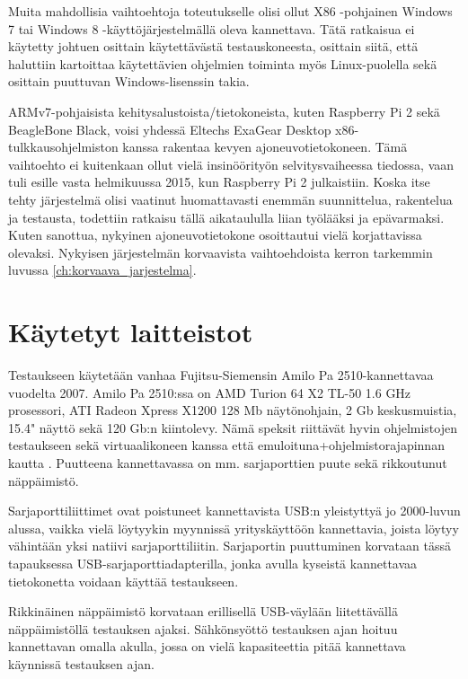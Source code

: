 Muita mahdollisia vaihtoehtoja toteutukselle olisi ollut X86 -pohjainen Windows 7 tai Windows 8 -käyttöjärjestelmällä oleva kannettava. Tätä ratkaisua ei käytetty johtuen osittain käytettävästä testauskoneesta, osittain siitä, että haluttiin kartoittaa käytettävien ohjelmien toiminta myös Linux-puolella sekä osittain puuttuvan Windows-lisenssin takia.

ARMv7-pohjaisista kehitysalustoista/tietokoneista, kuten Raspberry Pi 2 sekä BeagleBone Black, voisi yhdessä Eltechs ExaGear Desktop x86-tulkkausohjelmiston kanssa rakentaa kevyen ajoneuvotietokoneen. Tämä vaihtoehto ei kuitenkaan ollut vielä insinöörityön selvitysvaiheessa tiedossa, vaan tuli esille vasta helmikuussa 2015, kun Raspberry Pi 2 julkaistiin. Koska itse tehty järjestelmä olisi vaatinut huomattavasti enemmän suunnittelua, rakentelua ja testausta, todettiin ratkaisu tällä aikataululla liian työlääksi ja epävarmaksi. Kuten sanottua, nykyinen ajoneuvotietokone osoittautui vielä korjattavissa olevaksi. Nykyisen järjestelmän korvaavista vaihtoehdoista kerron tarkemmin luvussa \ref{ch:korvaava_jarjestelma}.

\section{Käytetyt laitteistot}

Testaukseen käytetään vanhaa Fujitsu-Siemensin Amilo Pa 2510-kannettavaa vuodelta 2007. Amilo Pa 2510:ssa on AMD Turion 64 X2 TL-50 1.6 GHz prosessori, ATI Radeon Xpress X1200 128 Mb näytönohjain, 2 Gb keskusmuistia, 15.4" näyttö sekä 120 Gb:n kiintolevy. Nämä speksit riittävät hyvin ohjelmistojen testaukseen sekä virtuaalikoneen kanssa että emuloituna+ohjelmistorajapinnan kautta \cite{fs_amilo:review}. Puutteena kannettavassa on mm. sarjaporttien puute sekä rikkoutunut näppäimistö.

Sarjaporttiliittimet ovat poistuneet kannettavista USB:n yleistyttyä jo 2000-luvun alussa, vaikka vielä löytyykin myynnissä yrityskäyttöön kannettavia, joista löytyy vähintään yksi natiivi sarjaporttiliitin\cite{hp:laptop}. Sarjaportin puuttuminen korvataan tässä tapauksessa USB-sarjaporttiadapterilla, jonka avulla kyseistä kannettavaa tietokonetta voidaan käyttää testaukseen.

Rikkinäinen näppäimistö korvataan erillisellä USB-väylään liitettävällä näppäimistöllä testauksen ajaksi. Sähkönsyöttö testauksen ajan hoituu kannettavan omalla akulla, jossa on vielä kapasiteettia pitää kannettava käynnissä testauksen ajan.

